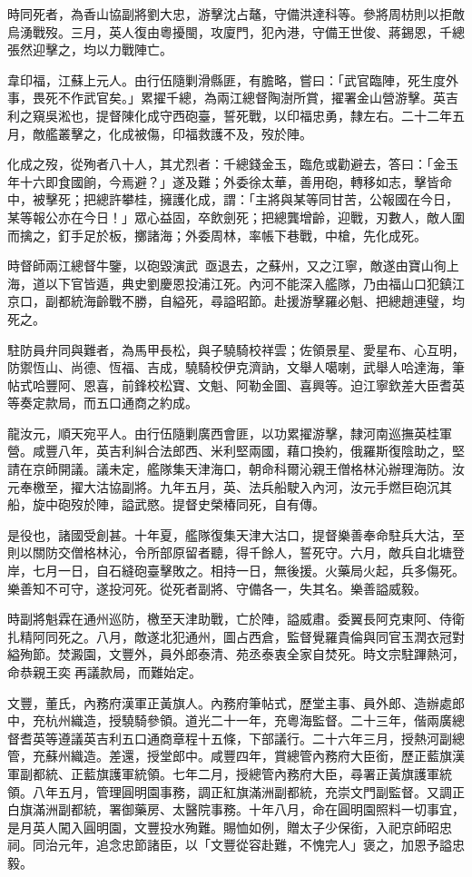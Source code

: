 \begin{pinyinscope}
時同死者，為香山協副將劉大忠，游擊沈占鼇，守備洪達科等。參將周枋則以拒敵烏湧戰歿。三月，英人復由粵擾閩，攻廈門，犯內港，守備王世俊、蔣錫恩，千總張然迎擊之，均以力戰陣亡。

韋印福，江蘇上元人。由行伍隨剿滑縣匪，有膽略，嘗曰：「武官臨陣，死生度外事，畏死不作武官矣。」累擢千總，為兩江總督陶澍所賞，擢署金山營游擊。英吉利之窺吳淞也，提督陳化成守西砲臺，誓死戰，以印福忠勇，隸左右。二十二年五月，敵艦叢擊之，化成被傷，印福救護不及，歿於陣。

化成之歿，從殉者八十人，其尤烈者：千總錢金玉，臨危或勸避去，答曰：「金玉年十六即食國餉，今焉避？」遂及難；外委徐太華，善用砲，轉移如志，擊皆命中，被擊死；把總許攀桂，擁護化成，謂：「主將與某等同甘苦，公報國在今日，某等報公亦在今日！」眾心益固，卒飲劍死；把總龔增齡，迎戰，刃數人，敵人圍而擒之，釘手足於板，擲諸海；外委周林，率帳下巷戰，中槍，先化成死。

時督師兩江總督牛鑒，以砲毀演武，亟退去，之蘇州，又之江寧，敵遂由寶山徇上海，道以下官皆遁，典史劉慶恩投浦江死。內河不能深入艦隊，乃由福山口犯鎮江京口，副都統海齡戰不勝，自縊死，尋謚昭節。赴援游擊羅必魁、把總趙連璧，均死之。

駐防員弁同與難者，為馬甲長松，與子驍騎校祥雲；佐領景星、愛星布、心互明，防禦恆山、尚德、恆福、吉成，驍騎校伊克濟訥，文舉人噶喇，武舉人哈達海，筆帖式哈豐阿、恩喜，前鋒校松寶、文魁、阿勒金圖、喜興等。迫江寧欽差大臣耆英等奏定款局，而五口通商之約成。

龍汝元，順天宛平人。由行伍隨剿廣西會匪，以功累擢游擊，隸河南巡撫英桂軍營。咸豐八年，英吉利糾合法郎西、米利堅兩國，藉口換約，俄羅斯復陰助之，堅請在京師開議。議未定，艦隊集天津海口，朝命科爾沁親王僧格林沁辦理海防。汝元奉檄至，擢大沽協副將。九年五月，英、法兵船駛入內河，汝元手燃巨砲沉其船，旋中砲歿於陣，謚武愍。提督史榮椿同死，自有傳。

是役也，諸國受創甚。十年夏，艦隊復集天津大沽口，提督樂善奉命駐兵大沽，至則以關防交僧格林沁，令所部原留者聽，得千餘人，誓死守。六月，敵兵自北塘登岸，七月一日，自石縫砲臺擊敗之。相持一日，無後援。火藥局火起，兵多傷死。樂善知不可守，遂投河死。從死者副將、守備各一，失其名。樂善謚威毅。

時副將魁霖在通州巡防，檄至天津助戰，亡於陣，謚威肅。委翼長阿克東阿、侍衛扎精阿同死之。八月，敵遂北犯通州，圖占西倉，監督覺羅貴倫與同官玉潤衣冠對縊殉節。焚澱園，文豐外，員外郎泰清、苑丞泰衷全家自焚死。時文宗駐蹕熱河，命恭親王奕再議款局，而難始定。

文豐，董氏，內務府漢軍正黃旗人。內務府筆帖式，歷堂主事、員外郎、造辦處郎中，充杭州織造，授驍騎參領。道光二十一年，充粵海監督。二十三年，偕兩廣總督耆英等遵議英吉利五口通商章程十五條，下部議行。二十六年三月，授熱河副總管，充蘇州織造。差還，授堂郎中。咸豐四年，賞總管內務府大臣銜，歷正藍旗漢軍副都統、正藍旗護軍統領。七年二月，授總管內務府大臣，尋署正黃旗護軍統領。八年五月，管理圓明園事務，調正紅旗滿洲副都統，充崇文門副監督。又調正白旗滿洲副都統，署御藥房、太醫院事務。十年八月，命在圓明園照料一切事宜，是月英人闖入圓明園，文豐投水殉難。賜恤如例，贈太子少保銜，入祀京師昭忠祠。同治元年，追念忠節諸臣，以「文豐從容赴難，不愧完人」褒之，加恩予謚忠毅。


\end{pinyinscope}
